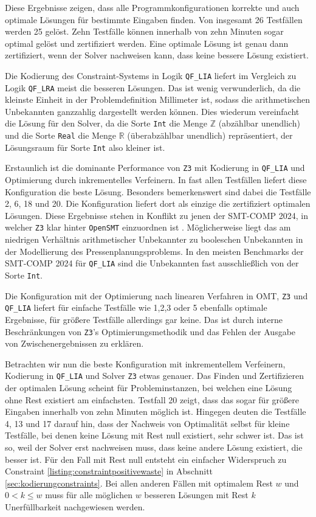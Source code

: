 Diese Ergebnisse zeigen, dass alle Programmkonfigurationen korrekte und auch optimale Lösungen für bestimmte Eingaben finden.
Von insgesamt 26 Testfällen werden 25 gelöst.
Zehn Testfälle können innerhalb von zehn Minuten sogar optimal gelöst und zertifiziert werden.
Eine optimale Lösung ist genau dann zertifiziert, wenn der Solver nachweisen kann, dass keine bessere Lösung existiert.

Die Kodierung des Constraint-Systems in Logik \texttt{QF\_LIA} liefert im Vergleich zu Logik \texttt{QF\_LRA} meist die besseren Lösungen.
Das ist wenig verwunderlich, da die kleinste Einheit in der Problemdefinition Millimeter ist, sodass die arithmetischen Unbekannten ganzzahlig dargestellt werden können.
Dies wiederum vereinfacht die Lösung für den Solver, da die Sorte \texttt{Int} die Menge $\mathbb{Z}$ (abzählbar unendlich) und
die Sorte \texttt{Real} die Menge $\mathbb{R}$ (überabzählbar unendlich) repräsentiert, der Lösungsraum für Sorte \texttt{Int} also kleiner ist.

Erstaunlich ist die dominante Performance von \texttt{Z3} mit Kodierung in \texttt{QF\_LIA} und Optimierung durch inkrementelles Verfeinern.
In fast allen Testfällen liefert diese Konfiguration die beste Lösung.
Besonders bemerkenswert sind dabei die Testfälle 2, 6, 18 und 20.
Die Konfiguration liefert dort als einzige die zertifiziert optimalen Lösungen.
Diese Ergebnisse stehen in Konflikt zu jenen der SMT-COMP 2024, in welcher \texttt{Z3} klar hinter \texttt{OpenSMT} einzuordnen ist \cite{smtcomp2024results}.
Möglicherweise liegt das am niedrigen Verhältnis arithmetischer Unbekannter zu booleschen Unbekannten in der Modellierung des Pressenplanungsproblems.
In den meisten Benchmarks der SMT-COMP 2024 für \texttt{QF\_LIA} sind die Unbekannten fast ausschließlich von der Sorte \texttt{Int}.

Die Konfiguration mit der Optimierung nach linearen Verfahren in OMT, \texttt{Z3} und \texttt{QF\_LIA}
liefert für einfache Testfälle wie 1,2,3 oder 5 ebenfalls optimale Ergebnisse, für größere Testfälle allerdings gar keine.
Das ist durch interne Beschränkungen von \texttt{Z3}'s Optimierungsmethodik und das Fehlen der Ausgabe von Zwischenergebnissen zu erklären.

Betrachten wir nun die beste Konfiguration mit inkrementellem Verfeinern, Kodierung in \texttt{QF\_LIA} und Solver \texttt{Z3} etwas genauer.
Das Finden und Zertifizieren der optimalen Lösung scheint für Probleminstanzen, bei welchen eine Lösung ohne Rest existiert am einfachsten.
Testfall 20 zeigt, dass das sogar für größere Eingaben innerhalb von zehn Minuten möglich ist.
Hingegen deuten die Testfälle 4, 13 und 17 darauf hin, dass der Nachweis von Optimalität selbst für kleine Testfälle,
bei denen keine Lösung mit Rest null existiert, sehr schwer ist.
Das ist so, weil der Solver erst nachweisen muss, dass keine andere Lösung existiert, die besser ist.
Für den Fall mit Rest null entsteht ein einfacher Widerspruch zu Constraint \ref{listing:constraintpositivewaste} in Abschnitt \ref{sec:kodierungconstraints}.
Bei allen anderen Fällen mit optimalem Rest $w$ und $0 < k \leq w$ muss für alle möglichen $w$ besseren Lösungen mit Rest $k$ Unerfüllbarkeit nachgewiesen werden.

